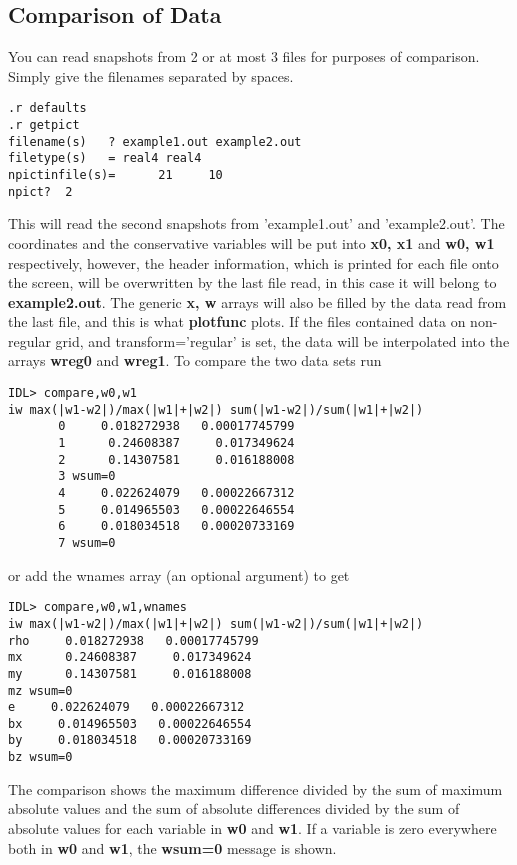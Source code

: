 \subsection{Comparison of Data \label{s-compare}}

   You can read snapshots from 2 or at most 3 files for purposes of
   comparison. Simply give the filenames separated by spaces.
\begin{verbatim}
.r defaults
.r getpict
filename(s)   ? example1.out example2.out
filetype(s)   = real4 real4
npictinfile(s)=      21     10
npict?  2
\end{verbatim}
   This will read the second snapshots from 'example1.out' and
   'example2.out'. The coordinates and the conservative variables 
   will be put into {\bf x0, x1} and {\bf w0, w1} respectively, however, 
   the header information, which is printed for each file onto the screen, 
   will be overwritten by the last file read, in this case it will belong to
   {\bf example2.out}. The generic {\bf x, w} arrays will also be
   filled by the data read from the last file, and this is what 
   {\bf plotfunc} plots. If the files contained data on non-regular grid,
   and transform='regular' is set, the data will be interpolated into 
   the arrays {\bf wreg0} and {\bf wreg1}. 
   To compare the two data sets run
\begin{verbatim}
IDL> compare,w0,w1
iw max(|w1-w2|)/max(|w1|+|w2|) sum(|w1-w2|)/sum(|w1|+|w2|)
       0     0.018272938   0.00017745799
       1      0.24608387     0.017349624
       2      0.14307581     0.016188008
       3 wsum=0
       4     0.022624079   0.00022667312
       5     0.014965503   0.00022646554
       6     0.018034518   0.00020733169
       7 wsum=0
\end{verbatim}
or add the wnames array (an optional argument) to get
\begin{verbatim}
IDL> compare,w0,w1,wnames
iw max(|w1-w2|)/max(|w1|+|w2|) sum(|w1-w2|)/sum(|w1|+|w2|)
rho     0.018272938   0.00017745799
mx      0.24608387     0.017349624
my      0.14307581     0.016188008
mz wsum=0
e     0.022624079   0.00022667312
bx     0.014965503   0.00022646554
by     0.018034518   0.00020733169
bz wsum=0
\end{verbatim}
   The comparison shows the maximum difference divided by the sum of maximum 
   absolute
   values and the sum of absolute differences divided by the sum of absolute
   values for each variable in {\bf w0} and {\bf w1}. If a variable is zero
   everywhere both in {\bf w0} and {\bf w1}, the {\bf wsum=0} message is shown.
